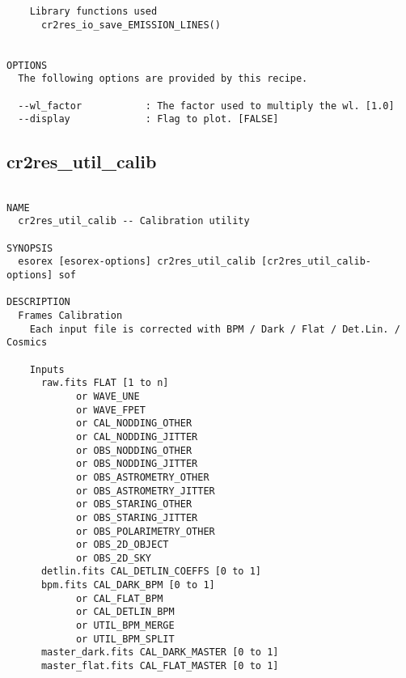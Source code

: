 \begin{verbatim}
    Library functions used                                                
      cr2res_io_save_EMISSION_LINES()                                     
  

OPTIONS
  The following options are provided by this recipe.

  --wl_factor           : The factor used to multiply the wl. [1.0]
  --display             : Flag to plot. [FALSE]

\end{verbatim}
\subsection{cr2res\_util\_calib}
\begin{verbatim}

NAME
  cr2res_util_calib -- Calibration utility

SYNOPSIS
  esorex [esorex-options] cr2res_util_calib [cr2res_util_calib-options] sof

DESCRIPTION
  Frames Calibration                                                      
    Each input file is corrected with BPM / Dark / Flat / Det.Lin. / Cosmics
                                                                          
    Inputs                                                                
      raw.fits FLAT [1 to n]                                
            or WAVE_UNE                                     
            or WAVE_FPET                                    
            or CAL_NODDING_OTHER                           
            or CAL_NODDING_JITTER                           
            or OBS_NODDING_OTHER                            
            or OBS_NODDING_JITTER                           
            or OBS_ASTROMETRY_OTHER                         
            or OBS_ASTROMETRY_JITTER                        
            or OBS_STARING_OTHER                            
            or OBS_STARING_JITTER                           
            or OBS_POLARIMETRY_OTHER                        
            or OBS_2D_OBJECT                                
            or OBS_2D_SKY                                   
      detlin.fits CAL_DETLIN_COEFFS [0 to 1]           
      bpm.fits CAL_DARK_BPM [0 to 1]                   
            or CAL_FLAT_BPM                            
            or CAL_DETLIN_BPM                          
            or UTIL_BPM_MERGE                          
            or UTIL_BPM_SPLIT                          
      master_dark.fits CAL_DARK_MASTER [0 to 1]        
      master_flat.fits CAL_FLAT_MASTER [0 to 1]        
                                                                          

\end{verbatim}

